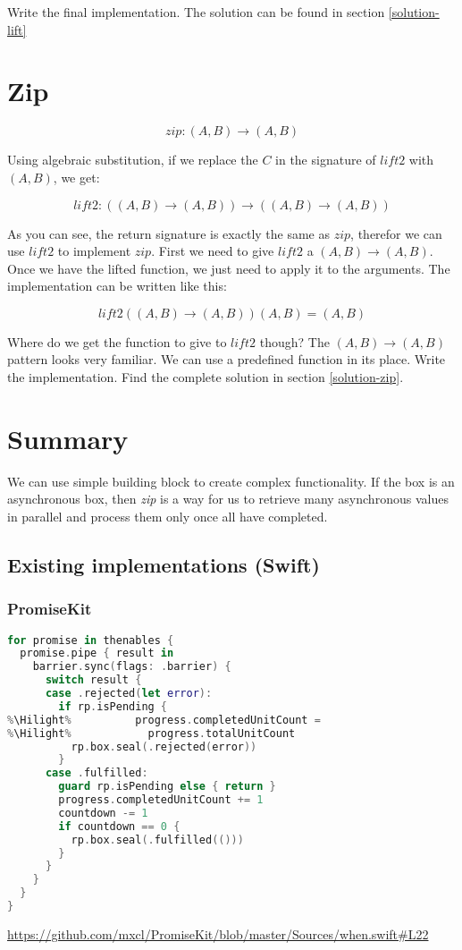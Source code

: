 \documentclass{shpdocumentation}
\begin{document}
Write the final implementation.  The solution can be found in section \ref{solution-lift}

\section{Zip}

\[ zip\colon (\boxed{A}, \boxed{B}) \to \boxed{(A, B)} \]

Using algebraic substitution, if we replace the $C$ in the signature of $lift2$ with $(A, B)$, we get:

\[ lift2\colon ((A, B) \to (A, B)) \to ((\boxed{A}, \boxed{B}) \to \boxed{(A, B)}) \]

As you can see, the return signature is exactly the same as $zip$, therefor we can use $lift2$ to implement $zip$.  First we need to give $lift2$ a $(A, B) \to (A, B)$.  Once we have the lifted function, we  just need to apply it to the arguments.  The implementation can be written like this:

\[ lift2((A, B) \to (A, B))(\boxed{A}, \boxed{B}) = \boxed{(A, B)} \]

Where do we get the function to give to $lift2$ though?  The $(A, B) \to (A, B)$ pattern looks very familiar.  We can use a predefined function in its place.  Write the implementation.  Find the complete solution in section \ref{solution-zip}.


\section{Summary}

We can use simple building block to create complex functionality. If the box is an asynchronous box, then \textit{zip} is a way for us to retrieve many asynchronous values in parallel and process them only once all have completed.

\subsection{Existing implementations (Swift)}

\subsubsection{PromiseKit}


\begin{lstlisting}[language=swift,escapechar=\%]
for promise in thenables {
  promise.pipe { result in
    barrier.sync(flags: .barrier) {
      switch result {
      case .rejected(let error):
        if rp.isPending {
%\Hilight%          progress.completedUnitCount =
%\Hilight%            progress.totalUnitCount
          rp.box.seal(.rejected(error))
        }
      case .fulfilled:
        guard rp.isPending else { return }
        progress.completedUnitCount += 1
        countdown -= 1
        if countdown == 0 {
          rp.box.seal(.fulfilled(()))
        }
      }
    }
  }
}
\end{lstlisting}
\url{https://github.com/mxcl/PromiseKit/blob/master/Sources/when.swift#L22}
\end{document}
